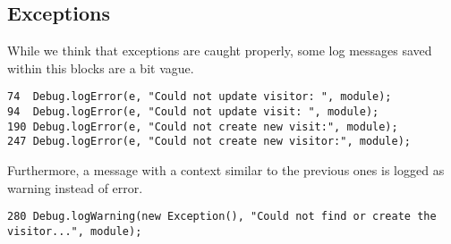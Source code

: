 \subsection{Exceptions}

    While we think that exceptions are caught properly, some log messages saved
within this blocks are a bit vague. 

    \begin{lstlisting}[basicstyle=\small\ttfamily,columns=fullflexible]
74  Debug.logError(e, "Could not update visitor: ", module);
94  Debug.logError(e, "Could not update visit: ", module);
190 Debug.logError(e, "Could not create new visit:", module);
247 Debug.logError(e, "Could not create new visitor:", module);
    \end{lstlisting}

    Furthermore, a message with a context similar to the previous ones is logged as warning instead of error.
    \begin{lstlisting}[basicstyle=\small\ttfamily,columns=fullflexible]
280 Debug.logWarning(new Exception(), "Could not find or create the visitor...", module);
    \end{lstlisting}
